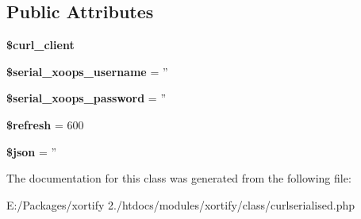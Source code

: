 \subsection*{Public Attributes}
\begin{DoxyCompactItemize}
\item 
\hypertarget{class_c_u_r_l_s_e_r_i_a_l_i_s_e_d_xortify_exchange_a22b06441424167f1c996c64823ea8e54}{{\bfseries \$curl\-\_\-client}}\label{class_c_u_r_l_s_e_r_i_a_l_i_s_e_d_xortify_exchange_a22b06441424167f1c996c64823ea8e54}

\item 
\hypertarget{class_c_u_r_l_s_e_r_i_a_l_i_s_e_d_xortify_exchange_afebe0bbb913c2abce366b908819ce94d}{{\bfseries \$serial\-\_\-xoops\-\_\-username} = ''}\label{class_c_u_r_l_s_e_r_i_a_l_i_s_e_d_xortify_exchange_afebe0bbb913c2abce366b908819ce94d}

\item 
\hypertarget{class_c_u_r_l_s_e_r_i_a_l_i_s_e_d_xortify_exchange_a6a248bdd97f181a11fd489dcf3a43f92}{{\bfseries \$serial\-\_\-xoops\-\_\-password} = ''}\label{class_c_u_r_l_s_e_r_i_a_l_i_s_e_d_xortify_exchange_a6a248bdd97f181a11fd489dcf3a43f92}

\item 
\hypertarget{class_c_u_r_l_s_e_r_i_a_l_i_s_e_d_xortify_exchange_abc2f27ee3187c6c9879a5ce9da70e5d5}{{\bfseries \$refresh} = 600}\label{class_c_u_r_l_s_e_r_i_a_l_i_s_e_d_xortify_exchange_abc2f27ee3187c6c9879a5ce9da70e5d5}

\item 
\hypertarget{class_c_u_r_l_s_e_r_i_a_l_i_s_e_d_xortify_exchange_a1fa42144727c9a5dbe3e5227a14dc984}{{\bfseries \$json} = ''}\label{class_c_u_r_l_s_e_r_i_a_l_i_s_e_d_xortify_exchange_a1fa42144727c9a5dbe3e5227a14dc984}

\end{DoxyCompactItemize}


The documentation for this class was generated from the following file\-:\begin{DoxyCompactItemize}
\item 
E\-:/\-Packages/xortify 2./htdocs/modules/xortify/class/curlserialised.\-php\end{DoxyCompactItemize}
